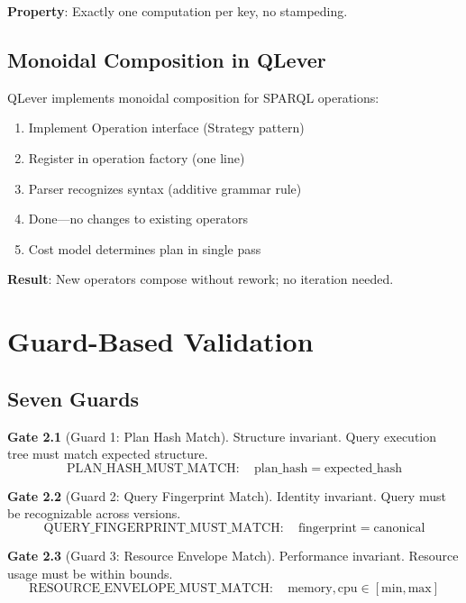 \documentclass[12pt,oneside,a4paper]{book}
\theoremstyle{definition}
\newtheorem{gate}{Gate}[chapter]
\begin{document}
\textbf{Property}: Exactly one computation per key, no stampeding.

\section{Monoidal Composition in QLever}
\label{sec:qlever-monoidal}

QLever implements monoidal composition for SPARQL operations:

\begin{enumerate}
  \item Implement Operation interface (Strategy pattern)
  \item Register in operation factory (one line)
  \item Parser recognizes syntax (additive grammar rule)
  \item Done—no changes to existing operators
  \item Cost model determines plan in single pass
\end{enumerate}

\textbf{Result}: New operators compose without rework; no iteration needed.

\chapter{Guard-Based Validation}
\label{ch:guards}


\section{Seven Guards}
\label{sec:seven-guards}

\begin{gate}[Guard 1: Plan Hash Match]
Structure invariant. Query execution tree must match expected structure.
$$\text{PLAN\_HASH\_MUST\_MATCH}: \quad \text{plan\_hash} = \text{expected\_hash}$$
\end{gate}

\begin{gate}[Guard 2: Query Fingerprint Match]
Identity invariant. Query must be recognizable across versions.
$$\text{QUERY\_FINGERPRINT\_MUST\_MATCH}: \quad \text{fingerprint} = \text{canonical}$$
\end{gate}

\begin{gate}[Guard 3: Resource Envelope Match]
Performance invariant. Resource usage must be within bounds.
$$\text{RESOURCE\_ENVELOPE\_MUST\_MATCH}: \quad \text{memory}, \text{cpu} \in [\text{min}, \text{max}]$$
\end{gate}
\end{document}
